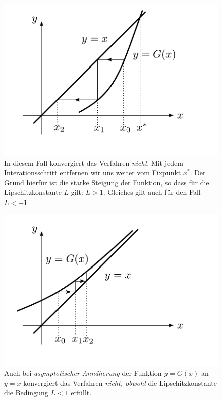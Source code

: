 \documentclass[10pt,a4paper]{article}
\begin{document}
\begin{figure}[H]
\includegraphics[width=\textwidth]{images/keine_FP_konvergenz_01}
\caption{In diesem Fall konvergiert das Verfahren \emph{nicht}. Mit jedem Interationsschritt entfernen wir uns weiter vom Fixpunkt $x^{*}$. Der Grund hierfür ist die starke Steigung der Funktion, so dass für die Lipschitzkonstante $L$ gilt: $L>1$. Gleiches gilt auch für den Fall $L<-1$}
\end{figure}

\begin{figure}[H]
\includegraphics[width=\textwidth]{images/keine_FP_konvergenz_02}
\caption{ Auch bei \emph{asymptotischer Annäherung} der Funktion $y=G(x)$ an $y=x$ konvergiert das Verfahren \emph{nicht, obwohl} die Lipschitzkonstante die Bedingung $L<1$ erfüllt.}
\end{figure}
\end{document}
